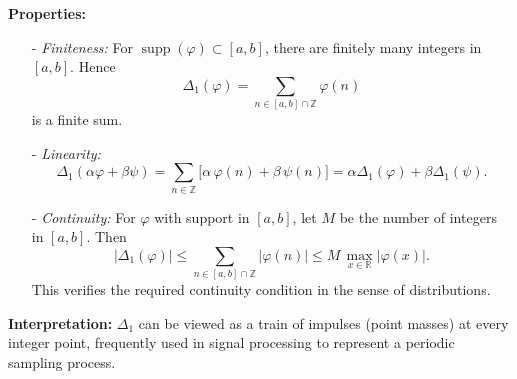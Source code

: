 \documentclass[11pt,openany]{book}
\begin{document}
\noindent
\textbf{Properties:}
\begin{itemize}
    \item[-] \emph{Finiteness:} For $\operatorname{supp}(\varphi) \subset [a,b]$, there are finitely many integers in $[a,b]$. Hence
    \[
    \Delta_{1}(\varphi) = \sum_{n \in [a,b] \cap \mathbb{Z}} \varphi(n)
    \]
    is a finite sum.

    \item[-] \emph{Linearity:}
    \[
    \Delta_{1}(\alpha \varphi + \beta \psi)
    = \sum_{n \in \mathbb{Z}} \bigl[\alpha\,\varphi(n) + \beta\,\psi(n)\bigr]
    = \alpha \Delta_{1}(\varphi) + \beta \Delta_{1}(\psi).
    \]

    \item[-] \emph{Continuity:}
    For $\varphi$ with support in $[a,b]$, let $M$ be the number of integers in $[a,b]$. Then
    \[
    |\Delta_{1}(\varphi)|
    \le \sum_{n \in [a,b] \cap \mathbb{Z}} |\varphi(n)|
    \le M \,\max_{x \in \mathbb{R}}|\varphi(x)|.
    \]
    This verifies the required continuity condition in the sense of distributions.
\end{itemize}

\noindent
\textbf{Interpretation:}
$\Delta_1$ can be viewed as a train of impulses (point masses) at every integer point, frequently used in signal processing to represent a periodic sampling process.
\end{document}
